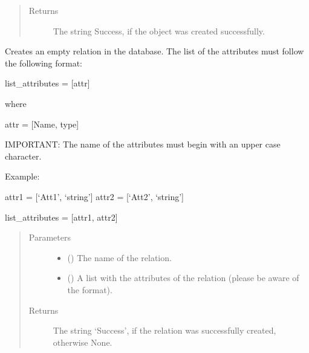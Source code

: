 \documentclass[letterpaper,10pt,english]{sphinxmanual}
\begin{document}
\begin{fulllineitems}
\begin{fulllineitems}
\begin{quote}
\begin{description}
\begin{itemize}
\end{itemize}

\item[{Returns}] \leavevmode
The string Success, if the object was created successfully.

\end{description}\end{quote}

\end{fulllineitems}


\begin{fulllineitems}
\label{\detokenize{index:secondodb.api.secondoapi.Cursor.execute_create_empty_relation}}
Creates an empty relation in the database. The list of the attributes must follow the following format:

list\_attributes = {[}attr{]}

where

attr = {[}Name, type{]}

IMPORTANT: The name of the attributes must begin with an upper case character.

Example:

attr1 = {[}‘Att1’, ‘string’{]}
attr2 = {[}‘Att2’, ‘string’{]}

list\_attributes = {[}attr1, attr2{]}
\begin{quote}\begin{description}
\item[{Parameters}] \leavevmode\begin{itemize}
\item {} 
 () \textendash{} The name of the relation.

\item {} 
 (\sphinxstyleliteralemphasis{\sphinxupquote{{[}}}\sphinxstyleliteralemphasis{\sphinxupquote{{]}}}) \textendash{} A list with the attributes of the relation (please be aware of the format).

\end{itemize}

\item[{Returns}] \leavevmode
The string ‘Success’, if the relation was successfully created, otherwise None.


\end{description}
\end{quote}
\end{fulllineitems}
\end{fulllineitems}
\end{document}

